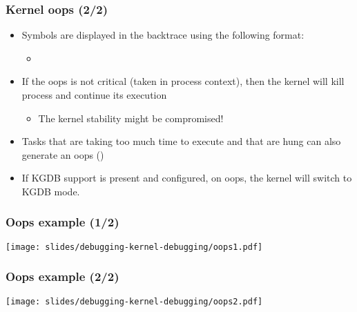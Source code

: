 \begin{frame}
  \frametitle{Kernel oops (2/2)}
  \begin{itemize}
    \item Symbols are displayed in the backtrace using the following format:
    \begin{itemize}
      \item {}
    \end{itemize}
    \item If the oops is not critical (taken in process context), then the
          kernel will kill process and continue its execution
    \begin{itemize}
      \item The kernel stability might be compromised!
    \end{itemize}
    \item Tasks that are taking too much time to execute and that are hung can
          also generate an oops ()
    \item If KGDB support is present and configured, on oops, the kernel will
          switch to KGDB mode.
  \end{itemize}
\end{frame}

\begin{frame}
  \frametitle{Oops example (1/2)}
  \begin{center}
    \texttt{[image: slides/debugging-kernel-debugging/oops1.pdf]}
  \end{center}
\end{frame}

\begin{frame}
  \frametitle{Oops example (2/2)}
  \begin{center}
    \texttt{[image: slides/debugging-kernel-debugging/oops2.pdf]}
  \end{center}
\end{frame}

